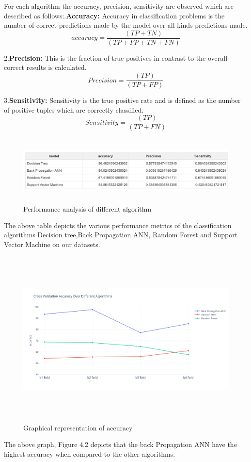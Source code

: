 For  each  algorithm  the  accuracy, precision, sensitivity are observed which are described as follows:.\textbf{Accuracy:} Accuracy in classification problems is the number of correct predictions made by the model over all kinds predictions made.
\[ accuracy=  \frac{(TP+TN)}{(TP+FP+TN+FN)} \]
 
2.\textbf{Precision:} This is the fraction of true positives in contrast to the overall correct results is calculated.
\[ Precision=  \frac{(TP)}{(TP+FP)} \]
 
3.\textbf{Sensitivity:} Sensitivity  is  the  true  positive  rate  and  is  defined  as  the number of positive tuples which are correctly classified.
 \[ Sensitivity=  \frac{(TP)}{(TP+FN)} \]
 
 \pagebreak
 \begin{figure}[H]
\begin{center}
\includegraphics[width=150mm,height=35mm]{comparison/summary.jpg}
 \caption{Performance analysis of different algorithm}
 \end{center}                
\end{figure}
The  above  table  depicts  the  various  performance metrics   of   the   classification   algorithms   Decision   tree,Back Propagation ANN, Random Forest and Support Vector Machine  on our datasets.
\begin{figure}[H]
\begin{center}
\includegraphics[width=150mm,height=90mm]{comparisonnew/accuracy.png}
 \caption{Graphical representation of accuracy}
 \end{center}                
\end{figure}
The above graph, Figure 4.2 depicts that the back Propagation ANN  have  the  highest  accuracy  when  compared  to  the other algorithms.
\pagebreak

